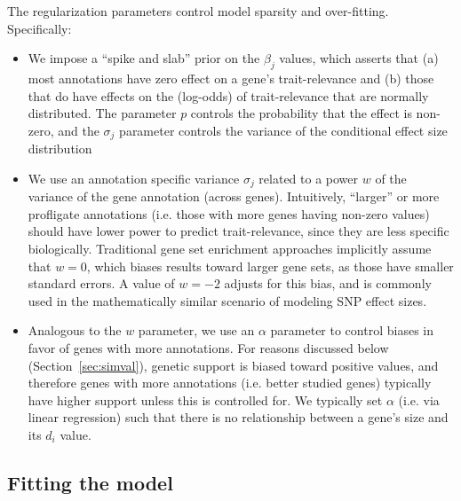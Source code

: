 The regularization parameters control model sparsity and
over-fitting. Specifically:
\begin{itemize}
  \item We impose a ``spike and slab'' prior on the $\beta_j$ values,
    which asserts that (a) most annotations have zero effect on a
    gene's trait-relevance and (b) those that do have effects on the
    (log-odds) of trait-relevance that are normally distributed. The
    parameter $p$ controls the probability that the effect is
    non-zero, and the $\sigma_j$ parameter controls the variance of
    the conditional effect size distribution
  \item We use an annotation specific variance $\sigma_j$ related to
    a power $w$ of the variance of the gene annotation (across
    genes). Intuitively, ``larger'' or more profligate annotations
    (i.e. those with more genes having non-zero values)
    should have lower power to predict trait-relevance, since they are
    less specific biologically. Traditional gene set enrichment approaches
    implicitly assume that $w=0$, which biases results toward larger gene sets,
    as those have smaller standard errors. A value of $w=-2$ adjusts
    for this bias, and is commonly used in the mathematically similar
    scenario of modeling SNP effect sizes\cite{}.
    \item Analogous to the $w$ parameter, we use an $\alpha$ parameter
      to control biases in favor of genes with more annotations. For
      reasons discussed below (Section~\ref{sec:simval}), genetic support is biased toward
      positive values, and therefore genes with more annotations
      (i.e. better studied genes) typically have higher support unless
      this is controlled for. We typically set $\alpha$ (i.e. via
      linear regression)
      such that there is no relationship between a gene's size and its
      $d_i$ value.
\end{itemize}

\subsection{Fitting the model}

